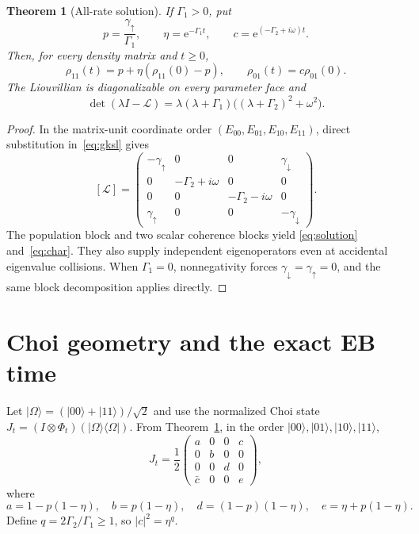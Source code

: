 \documentclass[10pt]{article}
\newtheorem{theorem}{Theorem}
\newcommand{\ee}{\mathrm e}
\begin{document}
\begin{theorem}[All-rate solution]\label{thm:flow}
If $\Gamma_1>0$, put
\[
 p=\frac{\gamma_\uparrow}{\Gamma_1},\qquad
 \eta=\ee^{-\Gamma_1t},\qquad
 c=\ee^{(-\Gamma_2+i\omega)t}.
\]
Then, for every density matrix and $t\geq0$,
\begin{equation}\label{eq:solution}
 \rho_{11}(t)=p+\eta(\rho_{11}(0)-p),\qquad
 \rho_{01}(t)=c\rho_{01}(0).
\end{equation}
The Liouvillian is diagonalizable on every parameter face and
\begin{equation}\label{eq:char}
 \det(\lambda I-\mathcal L)=
 \lambda(\lambda+\Gamma_1)\bigl((\lambda+\Gamma_2)^2+\omega^2\bigr).
\end{equation}
\end{theorem}
\begin{proof}
In the matrix-unit coordinate order $(E_{00},E_{01},E_{10},E_{11})$,
direct substitution in~\eqref{eq:gksl} gives
\[
 [\mathcal L]=\begin{pmatrix}
 -\gamma_\uparrow&0&0&\gamma_\downarrow\\
 0&-\Gamma_2+i\omega&0&0\\
 0&0&-\Gamma_2-i\omega&0\\
 \gamma_\uparrow&0&0&-\gamma_\downarrow
 \end{pmatrix}.
\]
The population block and two scalar coherence blocks yield
\eqref{eq:solution} and~\eqref{eq:char}.  They also supply independent
eigenoperators even at accidental eigenvalue collisions.  When $\Gamma_1=0$,
nonnegativity forces $\gamma_\downarrow=\gamma_\uparrow=0$, and the same
block decomposition applies directly.
\end{proof}

\section{Choi geometry and the exact EB time}
Let $|\Omega\rangle=(|00\rangle+|11\rangle)/\sqrt2$ and use the normalized
Choi state $J_t=(I\otimes\Phi_t)(|\Omega\rangle\langle\Omega|)$.  From
Theorem~\ref{thm:flow}, in the order $|00\rangle,|01\rangle,|10\rangle,
|11\rangle$,
\begin{equation}\label{eq:choi}
 J_t=\frac12\begin{pmatrix}
 a&0&0&c\\0&b&0&0\\0&0&d&0\\\bar c&0&0&e
 \end{pmatrix},
\end{equation}
where
\[
 a=1-p(1-\eta),\quad b=p(1-\eta),\quad
 d=(1-p)(1-\eta),\quad e=\eta+p(1-\eta).
\]
Define $q=2\Gamma_2/\Gamma_1\geq1$, so $|c|^2=\eta^q$.
\end{document}
